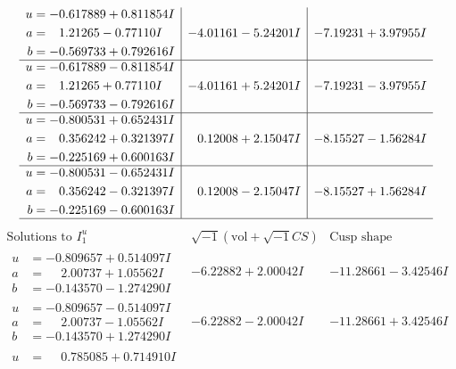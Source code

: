 \documentclass[1p]{elsarticle_modified}
\theoremstyle{definition}
\newcommand{\I}{\sqrt{-1}}
\begin{document}
$$\begin{array}{c|c|c}
\begin{aligned}
u &= -0.617889 + 0.811854 I \\
a &= \phantom{-}1.21265 - 0.77110 I \\
b &= -0.569733 + 0.792616 I\end{aligned}
 & -4.01161 - 5.24201 I & -7.19231 + 3.97955 I \\ \hline\begin{aligned}
u &= -0.617889 - 0.811854 I \\
a &= \phantom{-}1.21265 + 0.77110 I \\
b &= -0.569733 - 0.792616 I\end{aligned}
 & -4.01161 + 5.24201 I & -7.19231 - 3.97955 I \\ \hline\begin{aligned}
u &= -0.800531 + 0.652431 I \\
a &= \phantom{-}0.356242 + 0.321397 I \\
b &= -0.225169 + 0.600163 I\end{aligned}
 & \phantom{-}0.12008 + 2.15047 I & -8.15527 - 1.56284 I \\ \hline\begin{aligned}
u &= -0.800531 - 0.652431 I \\
a &= \phantom{-}0.356242 - 0.321397 I \\
b &= -0.225169 - 0.600163 I\end{aligned}
 & \phantom{-}0.12008 - 2.15047 I & -8.15527 + 1.56284 I\\
 \hline 
 \end{array}$$\newpage$$\begin{array}{c|c|c}  
\text{Solutions to }I^u_{1}& \I (\text{vol} + \sqrt{-1}CS) & \text{Cusp shape}\\
 \hline 
\begin{aligned}
u &= -0.809657 + 0.514097 I \\
a &= \phantom{-}2.00737 + 1.05562 I \\
b &= -0.143570 - 1.274290 I\end{aligned}
 & -6.22882 + 2.00042 I & -11.28661 - 3.42546 I \\ \hline\begin{aligned}
u &= -0.809657 - 0.514097 I \\
a &= \phantom{-}2.00737 - 1.05562 I \\
b &= -0.143570 + 1.274290 I\end{aligned}
 & -6.22882 - 2.00042 I & -11.28661 + 3.42546 I \\ \hline\begin{aligned}
u &= \phantom{-}0.785085 + 0.714910 I \\

\end{aligned}
\end{array}$$
\end{document}
